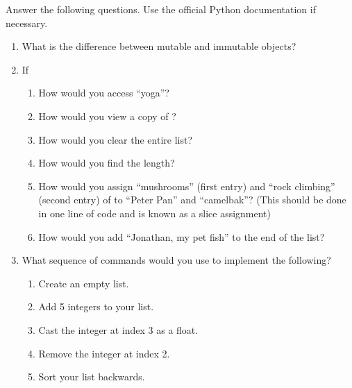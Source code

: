 \begin{problem}
Answer the following questions. Use the official Python documentation if necessary.

\begin{enumerate}
\item What is the difference between mutable and immutable objects?
\item If 
\begin{enumerate}
\item How would you access ``yoga''? 
\item How would you view a copy of ?
\item How would you clear the entire list? 
\item How would you find the length? 
\item How would you assign ``mushrooms'' (first entry) and ``rock climbing'' (second entry) 
of  to ``Peter Pan'' and ``camelbak''? 
(This should be done in one line of code and is known as a slice assignment)
\item How would you add ``Jonathan, my pet fish'' to the end of the list?
\end{enumerate}
\item What sequence of commands would you use to implement the following?
\begin{enumerate}
\item Create an empty list. 
\item Add 5 integers to your list. 
\item Cast the integer at index 3 as a float.
\item Remove the integer at index 2. 
\item Sort your list backwards.
\end{enumerate}
\end{enumerate}
\end{problem}


